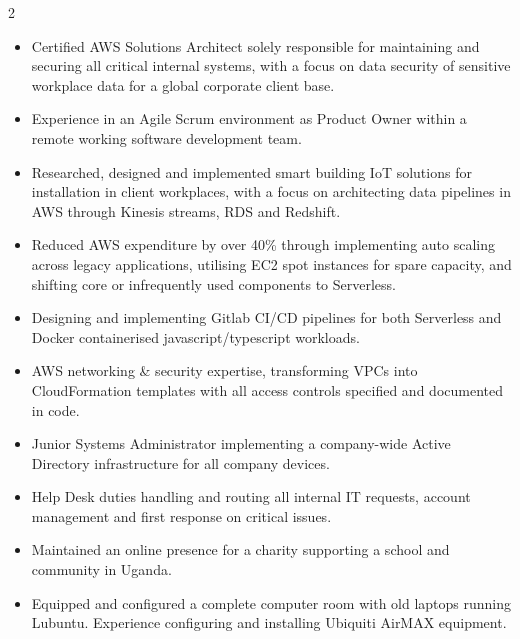\documentclass[10pt,a4paper,ragged2e,withhyper]{altacv}
\begin{document}
\begin{paracol}{2}

\begin{itemize}
\item Certified AWS Solutions Architect solely responsible for maintaining and securing all critical internal systems, with a focus on data security of sensitive workplace data for a global corporate client base.
\item Experience in an Agile Scrum environment as Product Owner within a remote working software development team.
\item Researched, designed and implemented smart building IoT solutions for installation in client workplaces, with a focus on architecting data pipelines in AWS through Kinesis streams, RDS and Redshift.
\item Reduced AWS expenditure by over 40\% through implementing auto scaling across legacy applications, utilising EC2 spot instances for spare capacity, and shifting core or infrequently used components to Serverless.
\item Designing and implementing Gitlab CI/CD pipelines for both Serverless and Docker containerised javascript/typescript workloads.
\item AWS networking \& security expertise, transforming VPCs into CloudFormation templates with all access controls specified and documented in code.
\end{itemize}

\begin{itemize}
\item Junior Systems Administrator implementing a company-wide Active Directory infrastructure for all company devices.
\item Help Desk duties handling and routing all internal IT requests, account management and first response on critical issues.
\end{itemize}

\divider

\begin{itemize}
\item Maintained an online presence for a charity supporting a school and community in Uganda.
\item Equipped and configured a complete computer room with old laptops running Lubuntu. Experience configuring and installing Ubiquiti AirMAX equipment.
\end{itemize}


\end{paracol}
\end{document}
